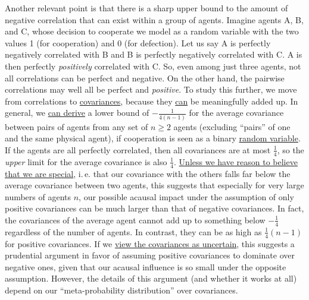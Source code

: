 Another relevant point is that there is a sharp upper bound to the
amount of negative correlation that can exist within a group of agents.
Imagine agents A, B, and C, whose decision to cooperate we model as a
random variable with the two values 1 (for cooperation) and 0 (for
defection). Let us say A is perfectly negatively correlated with B and B
is perfectly negatively correlated with C. A is then perfectly
\emph{positively} correlated with C. So, even among just three agents,
not all correlations can be perfect and negative. On the other hand, the
pairwise correlations may well all be perfect and \emph{positive}. To
study this further, we move from correlations to
\href{https://en.wikipedia.org/wiki/Covariance}{covariances},
because they
\href{https://en.wikipedia.org/wiki/Covariance\#Properties}{can}
be meaningfully added up. In general, we
\href{https://casparoesterheld.files.wordpress.com/2017/01/lowerboundavgcov.pdf}{can
derive} a lower bound of \(- \frac{1}{4(n - 1)}\) for the average
covariance between pairs of agents from any set of \(n \geq 2\) agents
(excluding ``pairs'' of one and the same physical agent), if cooperation
is seen as a binary
\href{https://en.wikipedia.org/wiki/Random_variable}{random variable}.
If the agents are all perfectly correlated, then all covariances are at
most \(\frac{1}{4}\), so the \emph{upper} limit for the average
covariance is also \(\frac{1}{4}\).
\href{https://en.wikipedia.org/wiki/Mediocrity_principle}{Unless
we have reason to believe that we are special}, i.\,e. that our
covariance with the others falls far below the average covariance
between two agents, this suggests that especially for very large numbers
of agents \(n\), our possible acausal impact under the assumption of
only positive covariances can be much larger than that of negative
covariances. In fact, the covariances of the average agent cannot add up
to something below \(- \frac{1}{4}\) regardless of the number of agents.
In contrast, they can be as high as \(\frac{1}{4}(n - 1)\) for positive
covariances. If we
\href{https://casparoesterheld.com/2016/10/21/environmental-and-logical-uncertainty-reported-environmental-probabilities-as-expected-environmental-probabilities-under-logical-uncertainty/}{view
the covariances as uncertain}, this suggests a prudential argument in
favor of assuming positive covariances to dominate over negative ones,
given that our acausal influence is so small under the opposite
assumption. However, the details of this argument (and whether it works
at all) depend on our ``meta-probability distribution'' over
covariances.

